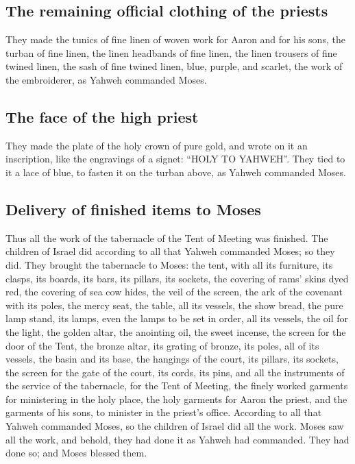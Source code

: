 \hypertarget{the-remaining-official-clothing-of-the-priests}{%
\subsection{The remaining official clothing of the
priests}\label{the-remaining-official-clothing-of-the-priests}}

 They made the tunics of fine linen of woven work for
Aaron and for his sons,  the turban of fine linen, the
linen headbands of fine linen, the linen trousers of fine twined linen,
 the sash of fine twined linen, blue, purple, and
scarlet, the work of the embroiderer, as Yahweh commanded Moses.

\hypertarget{the-face-of-the-high-priest}{%
\subsection{The face of the high
priest}\label{the-face-of-the-high-priest}}

 They made the plate of the holy crown of pure gold, and
wrote on it an inscription, like the engravings of a signet: ``HOLY TO
YAHWEH''.  They tied to it a lace of blue, to fasten it
on the turban above, as Yahweh commanded Moses.

\hypertarget{delivery-of-finished-items-to-moses}{%
\subsection{Delivery of finished items to
Moses}\label{delivery-of-finished-items-to-moses}}

 Thus all the work of the tabernacle of the Tent of
Meeting was finished. The children of Israel did according to all that
Yahweh commanded Moses; so they did.  They brought the
tabernacle to Moses: the tent, with all its furniture, its clasps, its
boards, its bars, its pillars, its sockets,  the covering
of rams' skins dyed red, the covering of sea cow hides, the veil of the
screen,  the ark of the covenant with its poles, the
mercy seat,  the table, all its vessels, the show bread,
 the pure lamp stand, its lamps, even the lamps to be set
in order, all its vessels, the oil for the light,  the
golden altar, the anointing oil, the sweet incense, the screen for the
door of the Tent,  the bronze altar, its grating of
bronze, its poles, all of its vessels, the basin and its base,
 the hangings of the court, its pillars, its sockets, the
screen for the gate of the court, its cords, its pins, and all the
instruments of the service of the tabernacle, for the Tent of Meeting,
 the finely worked garments for ministering in the holy
place, the holy garments for Aaron the priest, and the garments of his
sons, to minister in the priest's office.  According to
all that Yahweh commanded Moses, so the children of Israel did all the
work.  Moses saw all the work, and behold, they had done
it as Yahweh had commanded. They had done so; and Moses blessed them.

